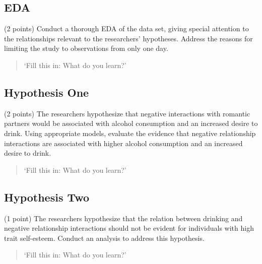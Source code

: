 \documentclass[
  11pt,
]{article}
\begin{document}
\hypertarget{eda}{%
\subsection{EDA}\label{eda}}

(2 points) Conduct a thorough EDA of the data set, giving special
attention to the relationships relevant to the researchers' hypotheses.
Address the reasons for limiting the study to observations from only one
day.

\begin{quote}
`Fill this in: What do you learn?'
\end{quote}

\hypertarget{hypothesis-one}{%
\subsection{Hypothesis One}\label{hypothesis-one}}

(2 points) The researchers hypothesize that negative interactions with
romantic partners would be associated with alcohol consumption and an
increased desire to drink. Using appropriate models, evaluate the
evidence that negative relationship interactions are associated with
higher alcohol consumption and an increased desire to drink.

\begin{quote}
`Fill this in: What do you learn?'
\end{quote}

\hypertarget{hypothesis-two}{%
\subsection{Hypothesis Two}\label{hypothesis-two}}

(1 point) The researchers hypothesize that the relation between drinking
and negative relationship interactions should not be evident for
individuals with high trait self-esteem. Conduct an analysis to address
this hypothesis.

\begin{quote}
`Fill this in: What do you learn?'
\end{quote}
\end{document}
